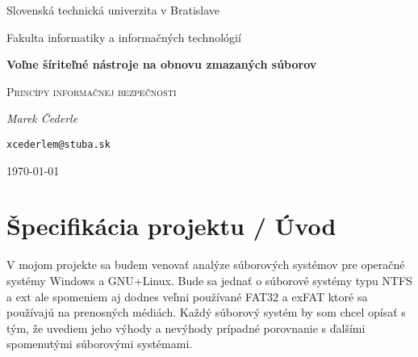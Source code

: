 \documentclass[12pt,oneside,slovak,a4paper]{article}
\begin{document}
\linespread{1.5}\selectfont


\begin{titlepage}
	\centering
    {\Large Slovenská technická univerzita v Bratislave\par}
    {\Large Fakulta informatiky a informačných technológií\par}
	\vspace{7cm}
	{\huge\bfseries Voľne šíriteľné nástroje na obnovu zmazaných súborov\par}
	\vspace{0.5cm}
    {\Large \textsc{Princípy informačnej bezpečnosti}\par}
    \vspace{1cm}
	{\Large\itshape Marek Čederle\par}
    {\small\texttt{xcederlem@stuba.sk}\par}
	\vfill

	{\large \today\par}
\end{titlepage}


\tableofcontents
\vspace*{\fill}


\section{Špecifikácia projektu / Úvod}
V mojom projekte sa budem venovať analýze súborových systémov pre operačné systémy Windows a GNU+Linux. Bude sa jednať o súborové systémy typu NTFS a ext ale spomeniem aj dodnes veľmi používané FAT32 a exFAT ktoré sa používajú na prenosných médiách. Každý súborový systém by som chcel opísať s tým, že uvediem jeho výhody a nevýhody prípadné porovnanie s ďalšími spomenutými súborovými systémami. 
\end{document}
